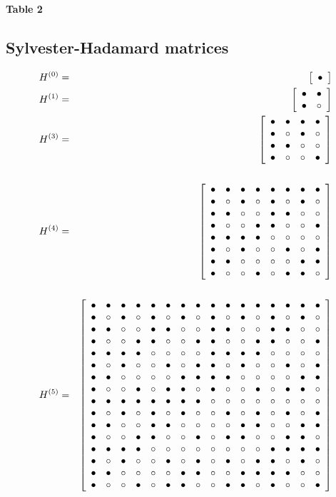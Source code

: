 \documentclass[12pt]{article}
\numberwithin{equation}{section}
\begin{document}
\centerline{{\bf Table 2} }




\newpage
%
\def\b{\circ}   \def\a{\bullet}

\subsection{Sylvester-Hadamard matrices}

\begin{eqnarray*}
%
H^{(0)}&=&\left[\begin{array}{c}\a \cr\end{array}\right]
\\
H^{(1)}&=&
\left[\begin{array}{cc}
      \a &\a  \cr
      \a &\b  \cr
\end{array}\right]
\\
H^{(3)}&=&
\left[\begin{array}{cccc}
\a &\a &\a &\a  \cr
\a &\b &\a &\b   \cr 
\a &\a &\b &\b   \cr
\a &\b &\b &\a   \cr
\end{array}\right]
\\
\\
H^{(4)}&=&
\left[\begin{array}{cccccccc}
\a &\a &\a &\a  &\a &\a &\a &\a    \cr
\a &\b &\a &\b  &\a &\b &\a &\b    \cr
\a &\a &\b &\b  &\a &\a &\b &\b    \cr
\a &\b &\b &\a  &\a &\b &\b &\a    \cr
%
\a &\a &\a &\a  &\b &\b &\b &\b    \cr 
\a &\b &\a &\b  &\b &\a &\b &\a    \cr 
\a &\a &\b &\b  &\b &\b &\a &\a    \cr 
\a &\b &\b &\a  &\b &\a &\a &\b    \cr 
\end{array}\right] 
\\
\\
H^{(5)}&=&
\left[\begin{array}{cccccccccccccccc}
\a &\a &\a &\a  &\a &\a &\a &\a  &\a &\a &\a &\a  &\a &\a &\a &\a  \cr
\a &\b &\a &\b  &\a &\b &\a &\b  &\a &\b &\a &\b  &\a &\b &\a &\b  \cr 
\a &\a &\b &\b  &\a &\a &\b &\b  &\a &\a &\b &\b  &\a &\a &\b &\b  \cr
\a &\b &\b &\a  &\a &\b &\b &\a  &\a &\b &\b &\a  &\a &\b &\b &\a  \cr
%
\a &\a &\a &\a  &\b &\b &\b &\b  &\a &\a &\a &\a  &\b &\b &\b &\b  \cr
\a &\b &\a &\b  &\b &\a &\b &\a  &\a &\b &\a &\b  &\b &\a &\b &\a  \cr
\a &\a &\b &\b  &\b &\b &\a &\a  &\a &\a &\b &\b  &\b &\b &\a &\a  \cr
\a &\b &\b &\a  &\b &\a &\a &\b  &\a &\b &\b &\a  &\b &\a &\a &\b  \cr
%
\a &\a &\a &\a  &\a &\a &\a &\a  &\b &\b &\b &\b  &\b &\b &\b &\b  \cr
\a &\b &\a &\b  &\a &\b &\a &\b  &\b &\a &\b &\a  &\b &\a &\b &\a  \cr
\a &\a &\b &\b  &\a &\a &\b &\b  &\b &\b &\a &\a  &\b &\b &\a &\a  \cr
\a &\b &\b &\a  &\a &\b &\b &\a  &\b &\a &\a &\b  &\b &\a &\a &\b  \cr
%
\a &\a &\a &\a  &\b &\b &\b &\b  &\b &\b &\b &\b  &\a &\a &\a &\a  \cr
\a &\b &\a &\b  &\b &\a &\b &\a  &\b &\a &\b &\a  &\a &\b &\a &\b  \cr
\a &\a &\b &\b  &\b &\b &\a &\a  &\b &\b &\a &\a  &\a &\a &\b &\b  \cr
\a &\b &\b &\a  &\b &\a &\a &\b  &\b &\a &\a &\b  &\a &\b &\b &\a  \cr
\end{array}\right]
\end{eqnarray*}
\end{document}
